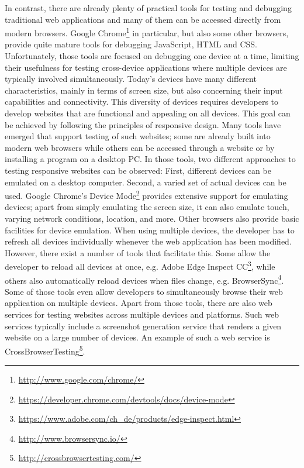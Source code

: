 In contrast, there are already plenty of practical tools for testing and debugging traditional web applications and many of them can be accessed directly from modern browsers. Google Chrome\footnote{\url{http://www.google.com/chrome/}} in particular, but also some other browsers, provide quite mature tools for debugging JavaScript, HTML and CSS. Unfortunately, those tools are focused on debugging one device at a time, limiting their usefulness for testing cross-device applications where multiple devices are typically involved simultaneously. Today's devices have many different characteristics, mainly in terms of screen size, but also concerning their input capabilities and connectivity. This diversity of devices requires developers to develop websites that are functional and appealing on all devices. This goal can be achieved by following the principles of responsive design. Many tools have emerged that support testing of such websites; some are already built into modern web browsers while others can be accessed through a website or by installing a program on a desktop PC. In those tools, two different approaches to testing responsive websites can be observed: First, different devices can be emulated on a desktop computer. Second, a varied set of actual devices can be used. Google Chrome's Device Mode\footnote{\url{https://developer.chrome.com/devtools/docs/device-mode}} provides extensive support for emulating devices; apart from simply emulating the screen size, it can also emulate touch, varying network conditions, location, and more. Other browsers also provide basic facilities for device emulation. When using multiple devices, the developer has to refresh all devices individually whenever the web application has been modified. However, there exist a number of tools that facilitate this. Some allow the developer to reload all devices at once, e.g. Adobe Edge Inspect CC\footnote{\url{https://www.adobe.com/ch_de/products/edge-inspect.html}}, while others also automatically reload devices when files change, e.g. BrowserSync\footnote{\url{http://www.browsersync.io/}}. Some of those tools even allow developers to simultaneously browse their web application on multiple devices. Apart from those tools, there are also web services for testing websites across multiple devices and platforms. Such web services typically include a screenshot generation service that renders a given website on a large number of devices. An example of such a web service is CrossBrowserTesting\footnote{\url{http://crossbrowsertesting.com/}}.

